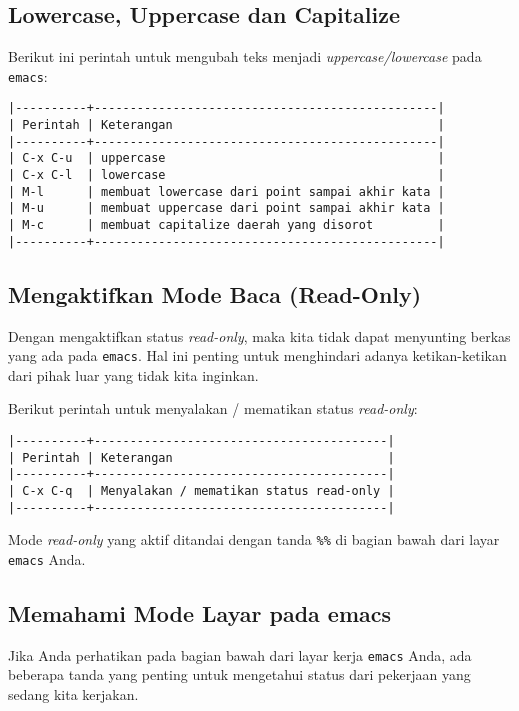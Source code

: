 \documentclass{article}
\begin{document}
\subsection{Lowercase, Uppercase dan Capitalize}
Berikut ini perintah untuk mengubah teks menjadi \emph{uppercase/lowercase}
pada \verb=emacs=:

\begin{verbatim}
|----------+------------------------------------------------|
| Perintah | Keterangan                                     |
|----------+------------------------------------------------|
| C-x C-u  | uppercase                                      |
| C-x C-l  | lowercase                                      |
| M-l      | membuat lowercase dari point sampai akhir kata |
| M-u      | membuat uppercase dari point sampai akhir kata |
| M-c      | membuat capitalize daerah yang disorot         |
|----------+------------------------------------------------|
\end{verbatim}

\subsection{Mengaktifkan Mode Baca (Read-Only)}
Dengan mengaktifkan status \emph{read-only}, maka kita tidak dapat menyunting
berkas yang ada pada \verb=emacs=. Hal ini penting untuk menghindari adanya
ketikan-ketikan dari pihak luar yang tidak kita inginkan.

Berikut perintah untuk menyalakan / mematikan status \emph{read-only}:

\begin{verbatim}
|----------+-----------------------------------------|
| Perintah | Keterangan                              |
|----------+-----------------------------------------|
| C-x C-q  | Menyalakan / mematikan status read-only |
|----------+-----------------------------------------|
\end{verbatim}

Mode \emph{read-only} yang aktif ditandai dengan tanda \verb=%%= di bagian 
bawah dari layar \verb=emacs= Anda.

\subsection{Memahami Mode Layar pada emacs}

Jika Anda perhatikan pada bagian bawah dari layar kerja \verb=emacs= Anda,
ada beberapa tanda yang penting untuk mengetahui status dari pekerjaan 
yang sedang kita kerjakan.
\end{document}
